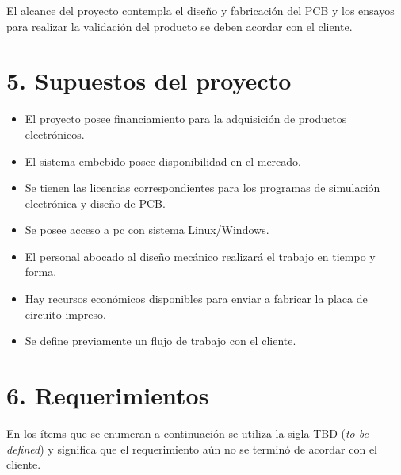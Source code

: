 \documentclass[
11pt, %
]{charter}
\begin{document}
	El alcance del proyecto contempla el diseño y fabricación del PCB y	los ensayos para realizar la validación del producto se deben acordar con el cliente.  
	
\section{5. Supuestos del proyecto}
\label{sec:supuestos}
\begin{itemize}
	\item El proyecto posee financiamiento para la adquisición de productos electrónicos.   
	\item El sistema embebido posee disponibilidad en el mercado. 
	\item Se tienen las licencias correspondientes para los programas de simulación electrónica y diseño de PCB.  
	\item Se posee acceso a pc con sistema Linux/Windows. 
	\item El personal abocado al diseño mecánico realizará el trabajo en tiempo y forma.  
	\item Hay recursos económicos disponibles para enviar a fabricar la placa de circuito impreso. 
	\item Se define previamente un flujo de trabajo con el cliente. 
\end{itemize}

\section{6. Requerimientos}
\label{sec:requerimientos}
	En los ítems que se enumeran a continuación se utiliza la sigla TBD (\textit{to be defined}) 
	y significa que el requerimiento aún no se terminó de acordar con el cliente. 
\end{document}
